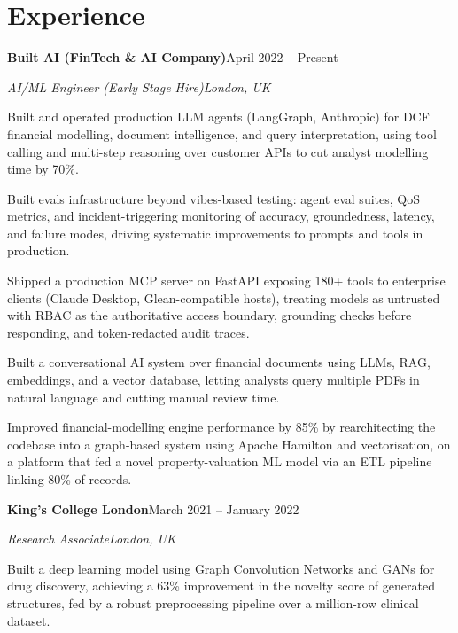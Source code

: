 \documentclass[10pt,a4paper]{article}
\newcommand{\entry}[4]{%
  {\color{company}\bfseries #1}\hfill {\color{muted}#2}\par
  \vspace{1pt}
  {\itshape #3}\hfill {\color{muted}\itshape #4}\par
  \vspace{3pt}%
}
\begin{document}
\section{Experience}
\entry{Built AI (FinTech \& AI Company)}{April 2022 -- Present}{AI/ML Engineer (Early Stage Hire)}{London, UK}
\begin{tight}
  \item Built and operated production LLM agents (LangGraph, Anthropic) for DCF financial modelling, document intelligence, and query interpretation, using tool calling and multi-step reasoning over customer APIs to cut analyst modelling time by 70\%.
  \item Built evals infrastructure beyond vibes-based testing: agent eval suites, QoS metrics, and incident-triggering monitoring of accuracy, groundedness, latency, and failure modes, driving systematic improvements to prompts and tools in production.
  \item Shipped a production MCP server on FastAPI exposing 180+ tools to enterprise clients (Claude Desktop, Glean-compatible hosts), treating models as untrusted with RBAC as the authoritative access boundary, grounding checks before responding, and token-redacted audit traces.
  \item Built a conversational AI system over financial documents using LLMs, RAG, embeddings, and a vector database, letting analysts query multiple PDFs in natural language and cutting manual review time.
  \item Improved financial-modelling engine performance by 85\% by rearchitecting the codebase into a graph-based system using Apache Hamilton and vectorisation, on a platform that fed a novel property-valuation ML model via an ETL pipeline linking 80\% of records.
\end{tight}

\entry{King's College London}{March 2021 -- January 2022}{Research Associate}{London, UK}
\begin{tight}
  \item Built a deep learning model using Graph Convolution Networks and GANs for drug discovery, achieving a 63\% improvement in the novelty score of generated structures, fed by a robust preprocessing pipeline over a million-row clinical dataset.
\end{tight}

\end{document}
